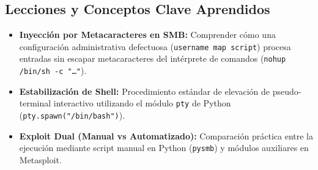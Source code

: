 \documentclass[../../../main_compilation.tex]{subfiles}
\begin{document}
\subsection{Lecciones y Conceptos Clave Aprendidos}

\begin{learningbox}
	\begin{itemize}[leftmargin=*]
		\item \textbf{Inyección por Metacaracteres en SMB:} Comprender cómo una configuración administrativa defectuosa (\texttt{username map script}) procesa entradas sin escapar metacaracteres del intérprete de comandos (\texttt{nohup /bin/sh -c "\ldots"}).
		\item \textbf{Estabilización de Shell:} Procedimiento estándar de elevación de pseudo-terminal interactivo utilizando el módulo \texttt{pty} de Python (\texttt{pty.spawn("/bin/bash")}).
		\item \textbf{Exploit Dual (Manual vs Automatizado):} Comparación práctica entre la ejecución mediante script manual en Python (\texttt{pysmb}) y módulos auxiliares en Metasploit.
	\end{itemize}
\end{learningbox}

\begin{sourcebox}
	\begin{itemize}[leftmargin=*]
	\end{itemize}
\end{sourcebox}
\end{document}
